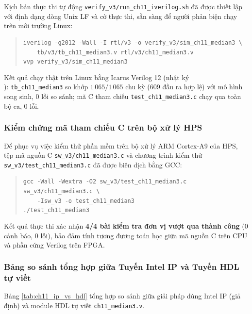 Kịch bản thực thi tự động \texttt{verify\_v3/run\_ch11\_iverilog.sh} đã được thiết lập với định dạng dòng Unix LF và cờ thực thi, sẵn sàng để người phản biện chạy trên môi trường Linux:
\begin{quote}
\footnotesize
\texttt{iverilog -g2012 -Wall -I rtl/v3 -o verify\_v3/sim\_ch11\_median3 \textbackslash}\\
\texttt{\ \ \ \ tb/v3/tb\_ch11\_median3.v rtl/v3/ch11\_median3.v}\\
\texttt{vvp verify\_v3/sim\_ch11\_median3}
\end{quote}

Kết quả chạy thật trên Linux bằng Icarus Verilog 12 (nhật ký\\ ): \texttt{tb\_ch11\_median3} so khớp $1\,065/1\,065$ chu kỳ ($609$ đầu ra hợp lệ) với mô hình song sinh, 0 lỗi so sánh; mã C tham chiếu \texttt{test\_ch11\_median3.c} chạy qua toàn bộ ca, 0 lỗi.

\subsubsection*{Kiểm chứng mã tham chiếu C trên bộ xử lý HPS}
Để phục vụ việc kiểm thử phần mềm trên bộ xử lý ARM Cortex-A9 của HPS, tệp mã nguồn C \texttt{sw\_v3/ch11\_median3.c} và chương trình kiểm thử \texttt{sw\_v3/test\_ch11\_median3.c} đã được biên dịch bằng GCC:
\begin{quote}
\footnotesize
\texttt{gcc -Wall -Wextra -O2 sw\_v3/test\_ch11\_median3.c sw\_v3/ch11\_median3.c \textbackslash}\\
\texttt{\ \ \ \ -Isw\_v3 -o test\_ch11\_median3}\\
\texttt{./test\_ch11\_median3}
\end{quote}
Kết quả thực thi xác nhận \textbf{4/4 bài kiểm tra đơn vị vượt qua thành công} (0 cảnh báo, 0 lỗi), bảo đảm tính tương đương toán học giữa mã nguồn C trên CPU và phần cứng Verilog trên FPGA.

\subsubsection*{Bảng so sánh tổng hợp giữa Tuyến Intel IP và Tuyến HDL tự viết}
Bảng \ref{tab:ch11_ip_vs_hdl} tổng hợp so sánh giữa giải pháp dùng Intel IP (giả định) và module HDL tự viết \texttt{ch11\_median3.v}.

